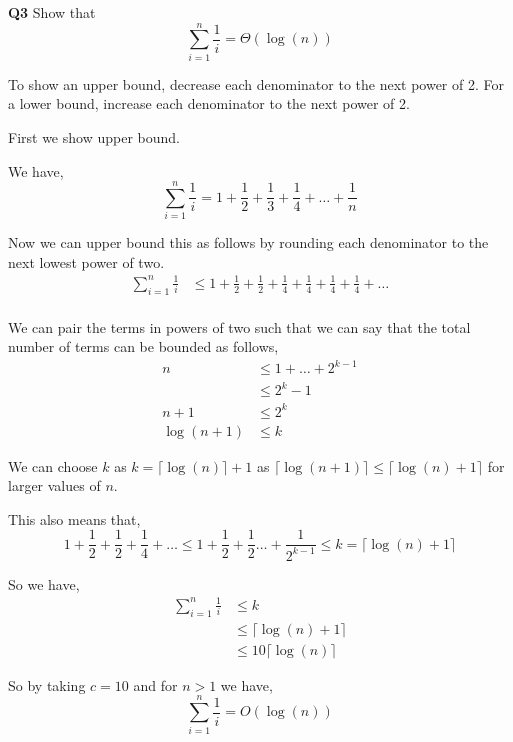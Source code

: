 \documentclass[12pt]{article}
\newcommand{\question}[3][Q]{
\begin{description}
\item \textbf{#1{#2}} #3
\end{description}
}
\newcommand{\hint}[1]{{\footnotesize
    \begin{description}
    [leftmargin=3.3em,style=nextline]
        \item[Hint:] {#1}
    \end{description}}   
}
\begin{document}
\newpage 

\question{3}{
    Show that $$\sum_{i=1}^{n} \frac{1}{i} = \Theta(\log(n))$$

    \hint{To show an upper bound, decrease each denominator to the next power of 2. For a lower bound, increase each denominator to the next power of 2.}
}

\begin{answer}
    First we show upper bound. 

    We have, 
    $$ \sum_{i = 1}^{n} \frac{1}{i} = 1 + \frac{1}{2} + \frac{1}{3} + \frac{1}{4} + \dots + \frac{1}{n} $$ 

    Now we can upper bound this as follows by rounding each denominator to the next lowest power of two.
    \begin{align*}
    \sum_{i = 1}^{n} \frac{1}{i} &\le 1 + \frac{1}{2} + \frac{1}{2} + \frac{1}{4} + \frac{1}{4} + \frac{1}{4} + \frac{1}{4} + \dots\\
    \end{align*}

    We can pair the terms in powers of two such that we can say that the total number of terms can be bounded as follows,
    \begin{align*}
        n &\le 1 + \dots + 2^{k - 1}\\
          &\le 2^{k} - 1\\
          n + 1&\le 2^{k}\\
          \log(n + 1) &\le k 
    \end{align*}

    We can choose $k$ as $k = \lceil \log(n) \rceil + 1$ as $\lceil \log(n + 1) \rceil \le \lceil \log(n) + 1 \rceil$ for larger values of  $n$.

    This also means that, 
    $$ 1 + \frac{1}{2} + \frac{1}{2} + \frac{1}{4} + \dots  \le 1 + \frac{1}{2} + \frac{1}{2} \dots + \frac{1}{2^{k - 1}}  \le k = \lceil \log(n) + 1 \rceil$$ 


    So we have, 
    \begin{align*}
        \sum_{i=1}^{n} \frac{1}{i} &\le k\\
                                   &\le \lceil \log(n) + 1 \rceil\\
                                   &\le 10 \lceil \log(n) \rceil
    \end{align*}

    So by taking $c = 10$ and for $n > 1$ we have, 
      $$\sum_{i=1}^{n} \frac{1}{i} = O(\log(n))$$
    



\end{answer}
\end{document}
